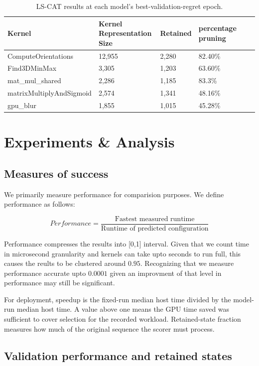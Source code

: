 \documentclass[11pt,letterpaper]{article}
\begin{document}
\begin{table}[H]
\centering\small
\caption{LS-CAT results at each model's best-validation-regret epoch.}
\begin{tabularx}{\linewidth}{@{}L{.24\linewidth}YYYYY@{}}
\toprule
\textbf{Kernel} & \textbf{Kernel Representation Size} & \textbf{Retained} & \textbf{percentage pruning} \\
\midrule
ComputeOrientations & 12,955 & 2,280 & 82.40\% \\
Find3DMinMax & 3,305 & 1,203 & 63.60\% \\
mat_mul_shared & 2,286 & 1,185 & 83.3\% \\
matrixMultiplyAndSigmoid & 2,574 & 1,341 & 48.16\% \\
gpu_blur & 1,855 & 1,015 & 45.28\% \\
\bottomrule
\end{tabularx}
\end{table}

\section{Experiments \& Analysis}

\subsection{Measures of success}

We primarily measure performance for comparision purposes. We define performance as follows:

\[
Performance = \frac{\text{Fastest measured runtime}}{\text{Runtime of predicted configuration}}
\]

Performance compresses the results into [0,1] interval. Given that we count time in microsecond granularity and kernels can take upto seconds to run full, this causes the reults to be clustered around $0.95$. Recognizing that
we measure performance accurate upto $0.0001$ given an improvment of that level in performance may still be significant.

For deployment, speedup is the fixed-run median host time divided by the model-run median host time. A value above one means the GPU time
saved was sufficient to cover selection for the recorded workload. Retained-state fraction measures how much
of the original sequence the scorer must process.


\subsection{Validation performance and retained states}
\end{document}
